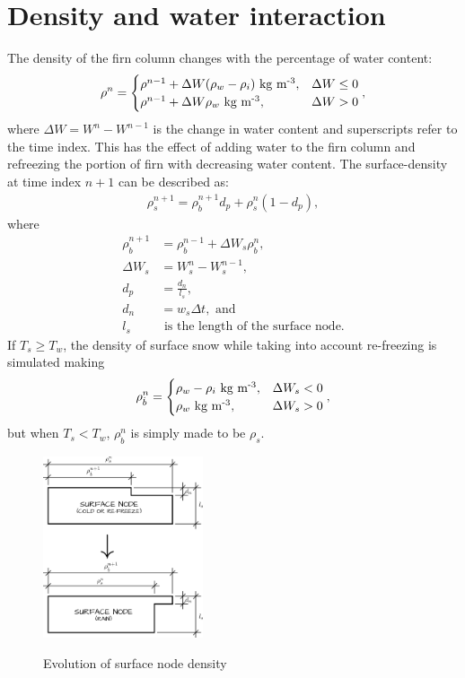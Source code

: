 \section{Density and water interaction}

The density of the firn column changes with the percentage of water content:
\begin{align*}
  \rho^n = 
  \begin{cases}
    \rho^{n-1} + \Delta W(\rho_w - \rho_i)\ \text{kg m\ensuremath{^{\textrm{-3}}}},  
      &\Delta W \leq 0\\
    \rho^{n-1} + \Delta W\rho_w\ \text{kg m\ensuremath{^{\textrm{-3}}}}, 
      &\Delta W > 0
  \end{cases},
\end{align*}
where $\Delta W = W^n - W^{n-1}$ is the change in water content and superscripts refer to the time index.  This has the effect of adding water to the firn column and refreezing the portion of firn with decreasing water content.  The surface-density at time index $n+1$ can be described as: 
\begin{align*}
  \rho_s^{n+1} = \rho_{\dot{b}}^{n+1} d_p + \rho_s^{n} (1 - d_p),
\end{align*}
where
\begin{align*}
  \rho_{\dot{b}}^{n+1} &= \rho_{\dot{b}}^{n-1} + \Delta W_s \rho_{\dot{b}}^n,\\
  \Delta W_s &= W_s^{n} - W_s^{n-1},\\
  d_p &= \frac{d_n}{l_s},\\
  d_n &= w_s\Delta t,\text{ and}\\
  l_s &\text{ is the length of the surface node.}
\end{align*}
If $T_s \geq T_w$, the density of surface snow while taking into account re-freezing is simulated making
\begin{align*}
  \rho_{\dot{b}}^n = 
  \begin{cases}
    \rho_w - \rho_i\ \text{kg m\ensuremath{^{\textrm{-3}}}},  &\Delta W_s < 0\\
    \rho_w\ \text{kg m\ensuremath{^{\textrm{-3}}}},           &\Delta W_s > 0
  \end{cases},
\end{align*}
but when $T_s < T_w$, $\rho_{\dot{b}}^n$ is simply made to be $\rho_s$.
\begin{figure}
	\centering
		\includegraphics[width=0.42\textwidth]{images/firn/surfaceDensity.png}
	\label{fig:500 year orbit}
	\caption{Evolution of surface node density}
\end{figure}


